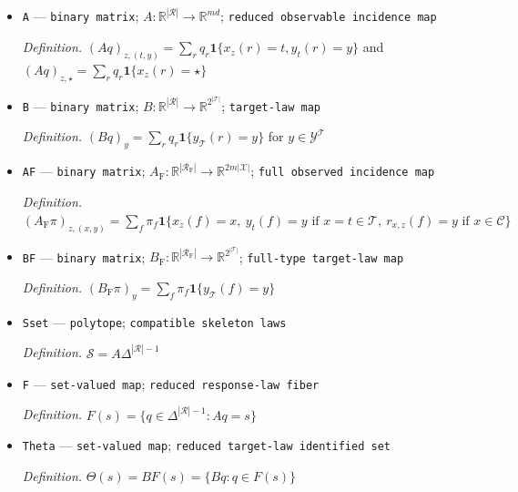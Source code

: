 \documentclass{article}
\begin{document}
\begin{itemize}
  \par\smallskip\noindent\emph{Definition.} \(\kappa((x_z)_z,y_{\mathcal T},r_{\mathcal C,\mathcal Z})=((\bar x_z)_z,y_{\mathcal T})\), where \(\bar x_z=x_z\) for \(x_z\in\mathcal T\) and \(\bar x_z=\star\) for \(x_z\in\mathcal C\)
  \item \texttt{A} --- \texttt{binary matrix}; \(A:\mathbb R^{|\mathcal R|}\to\mathbb R^{md}\); \texttt{reduced observable incidence map}
  \par\smallskip\noindent\emph{Definition.} \((Aq)_{z,(t,y)}=\sum_r q_r\mathbf 1\{x_z(r)=t,y_t(r)=y\}\) and \((Aq)_{z,\star}=\sum_r q_r\mathbf 1\{x_z(r)=\star\}\)
  \item \texttt{B} --- \texttt{binary matrix}; \(B:\mathbb R^{|\mathcal R|}\to\mathbb R^{2^{|\mathcal T|}}\); \texttt{target-\allowbreak{}law map}
  \par\smallskip\noindent\emph{Definition.} \((Bq)_y=\sum_r q_r\mathbf 1\{y_{\mathcal T}(r)=y\}\) for \(y\in\mathcal Y^{\mathcal T}\)
  \item \texttt{AF} --- \texttt{binary matrix}; \(A_{\mathrm F}:\mathbb R^{|\mathcal R_{\mathrm F}|}\to\mathbb R^{2m|\mathcal X|}\); \texttt{full observed incidence map}
  \par\smallskip\noindent\emph{Definition.} \((A_{\mathrm F}\pi)_{z,(x,y)}=\sum_f\pi_f\mathbf 1\{x_z(f)=x,\ y_t(f)=y\text{ if }x=t\in\mathcal T,\ r_{x,z}(f)=y\text{ if }x\in\mathcal C\}\)
  \item \texttt{BF} --- \texttt{binary matrix}; \(B_{\mathrm F}:\mathbb R^{|\mathcal R_{\mathrm F}|}\to\mathbb R^{2^{|\mathcal T|}}\); \texttt{full-\allowbreak{}type target-\allowbreak{}law map}
  \par\smallskip\noindent\emph{Definition.} \((B_{\mathrm F}\pi)_y=\sum_f\pi_f\mathbf 1\{y_{\mathcal T}(f)=y\}\)
  \item \texttt{Sset} --- \texttt{polytope}; \texttt{compatible skeleton laws}
  \par\smallskip\noindent\emph{Definition.} \(\mathcal S=A\Delta^{|\mathcal R|-1}\)
  \item \texttt{F} --- \texttt{set-\allowbreak{}valued map}; \texttt{reduced response-\allowbreak{}law fiber}
  \par\smallskip\noindent\emph{Definition.} \(F(s)=\{q\in\Delta^{|\mathcal R|-1}:Aq=s\}\)
  \item \texttt{Theta} --- \texttt{set-\allowbreak{}valued map}; \texttt{reduced target-\allowbreak{}law identified set}
  \par\smallskip\noindent\emph{Definition.} \(\Theta(s)=BF(s)=\{Bq:q\in F(s)\}\)

\end{itemize}
\end{document}
